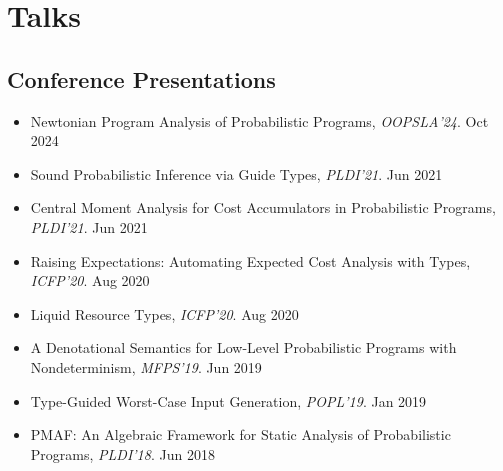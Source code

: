 \documentclass[11pt,letterpaper,sans]{moderncv}        %
\begin{document}
%
%
%
%
%
%
%

\section{Talks}

\subsection{Conference Presentations}

\begin{itemize}
  \item {Newtonian Program Analysis of Probabilistic Programs}, \emph{OOPSLA'24}. \hfill Oct 2024
  \item {Sound Probabilistic Inference via Guide Types}, \emph{PLDI'21}. \hfill Jun 2021
  \item {Central Moment Analysis for Cost Accumulators in Probabilistic Programs}, \emph{PLDI'21}. \hfill Jun 2021
  \item {Raising Expectations: Automating Expected Cost Analysis with Types}, \emph{ICFP'20}. \hfill Aug 2020
  \item {Liquid Resource Types}, \emph{ICFP'20}. \hfill Aug 2020
  \item {A Denotational Semantics for Low-Level Probabilistic Programs with Nondeterminism}, \emph{MFPS'19}. \hfill Jun 2019
  \item {Type-Guided Worst-Case Input Generation}, \emph{POPL'19}. \hfill Jan 2019
  \item {PMAF: An Algebraic Framework for Static Analysis of Probabilistic Programs}, \emph{PLDI'18}. \hfill Jun 2018
\end{itemize}
\end{document}
